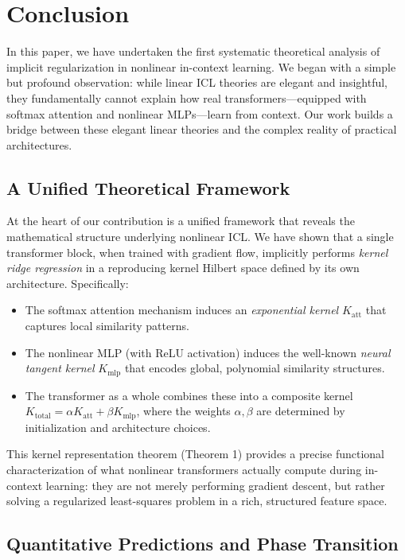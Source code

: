 	\section{Conclusion}
	\label{sec:conclusion}
	
	In this paper, we have undertaken the first systematic theoretical analysis of implicit regularization in nonlinear in-context learning. We began with a simple but profound observation: while linear ICL theories are elegant and insightful, they fundamentally cannot explain how real transformers—equipped with softmax attention and nonlinear MLPs—learn from context. Our work builds a bridge between these elegant linear theories and the complex reality of practical architectures.
	
	\subsection{A Unified Theoretical Framework}
	
	At the heart of our contribution is a unified framework that reveals the mathematical structure underlying nonlinear ICL. We have shown that a single transformer block, when trained with gradient flow, implicitly performs \textit{kernel ridge regression} in a reproducing kernel Hilbert space defined by its own architecture. Specifically:
	
	\begin{itemize}
		\item The softmax attention mechanism induces an \textit{exponential kernel} \(K_{\text{att}}\) that captures local similarity patterns.
		\item The nonlinear MLP (with ReLU activation) induces the well-known \textit{neural tangent kernel} \(K_{\text{mlp}}\) that encodes global, polynomial similarity structures.
		\item The transformer as a whole combines these into a composite kernel \(K_{\text{total}} = \alpha K_{\text{att}} + \beta K_{\text{mlp}}\), where the weights \(\alpha, \beta\) are determined by initialization and architecture choices.
	\end{itemize}
	
	This kernel representation theorem (Theorem 1) provides a precise functional characterization of what nonlinear transformers actually compute during in-context learning: they are not merely performing gradient descent, but rather solving a regularized least-squares problem in a rich, structured feature space.
	
	\subsection{Quantitative Predictions and Phase Transition}
	
